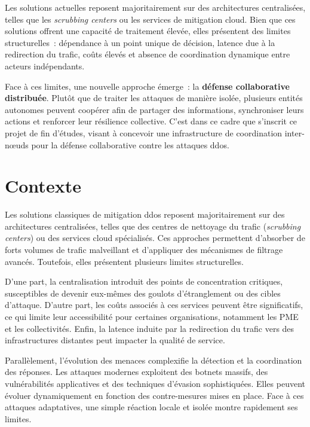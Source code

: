 Les solutions actuelles reposent majoritairement sur des architectures centralisées, telles que les \textit{scrubbing centers} ou les services de mitigation cloud. Bien que ces solutions offrent une capacité de traitement élevée, elles présentent des limites structurelles~: dépendance à un point unique de décision, latence due à la redirection du trafic, coûts élevés et absence de coordination dynamique entre acteurs indépendants.

Face à ces limites, une nouvelle approche émerge~: la \textbf{défense collaborative distribuée}. Plutôt que de traiter les attaques de manière isolée, plusieurs entités autonomes peuvent coopérer afin de partager des informations, synchroniser leurs actions et renforcer leur résilience collective. C'est dans ce cadre que s'inscrit ce projet de fin d'études, visant à concevoir une infrastructure de coordination inter-n\oe{}uds pour la défense collaborative contre les attaques \gls{ddos}.


\section*{Contexte}

Les solutions classiques de mitigation \gls{ddos} reposent majoritairement sur des architectures centralisées, telles que des centres de nettoyage du trafic (\textit{scrubbing centers}) ou des services cloud spécialisés. Ces approches permettent d'absorber de forts volumes de trafic malveillant et d'appliquer des mécanismes de filtrage avancés. Toutefois, elles présentent plusieurs limites structurelles.

D'une part, la centralisation introduit des points de concentration critiques, susceptibles de devenir eux-mêmes des goulots d'étranglement ou des cibles d'attaque. D'autre part, les coûts associés à ces services peuvent être significatifs, ce qui limite leur accessibilité pour certaines organisations, notamment les PME et les collectivités. Enfin, la latence induite par la redirection du trafic vers des infrastructures distantes peut impacter la qualité de service.

Parallèlement, l'évolution des menaces complexifie la détection et la coordination des réponses. Les attaques modernes exploitent des botnets massifs, des vulnérabilités applicatives et des techniques d'évasion sophistiquées. Elles peuvent évoluer dynamiquement en fonction des contre-mesures mises en place. Face à ces attaques adaptatives, une simple réaction locale et isolée montre rapidement ses limites.

